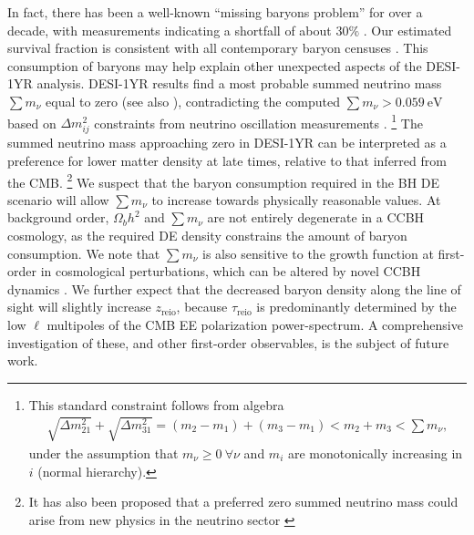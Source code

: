\documentclass[a4paper,11pt]{article}
\begin{document}
In fact, there has been a well-known ``missing baryons problem'' for over a decade, with measurements indicating a shortfall of about $30\%$ \cite{Shull2012}.
Our estimated survival fraction is consistent with all contemporary baryon censuses \cite[][Fig.~1]{Driver2021}. 
This consumption of baryons may help explain other unexpected aspects of the DESI-1YR analysis.
DESI-1YR results find a most probable summed neutrino mass $\sum m_\nu$ equal to zero \cite[Fig.~11, Left Panel][]{desicollaboration2024desi}(see also \cite{Wang:2024hen}), contradicting the computed $\sum m_\nu > 0.059~\mathrm{eV}$ based on $\Delta m_{ij}^2 $ constraints from neutrino oscillation measurements \cite[e.g.][]{dayabay, 2021Univ....7..459G}.%
\footnote{This standard constraint follows from algebra
\begin{align}
  \sqrt{\Delta m_{21}^2} + \sqrt{\Delta m_{31}^2} = (m_2 - m_1) + (m_3 - m_1) < m_2 + m_3 < \sum m_\nu,
\end{align}
under the assumption that $m_\nu \geqslant 0~\forall \nu$ and $m_i$ are monotonically increasing in $i$ (normal hierarchy).}
The summed neutrino mass approaching zero in DESI-1YR can be interpreted as a preference for lower matter density at late times, relative to that inferred from the CMB.%
\footnote{It has also been proposed that a preferred zero summed neutrino mass could arise from new physics in the neutrino sector \cite{Craig:2024tky}}
We suspect that the baryon consumption required in the BH DE scenario will allow $\sum m_\nu$ to increase towards physically reasonable values.
At background order, $\Omega_bh^2$ and $\sum m_\nu$ are not entirely degenerate in a CCBH cosmology, as the required DE density constrains the amount of baryon consumption.
We note that $\sum m_\nu$ is also sensitive to the growth function at first-order in cosmological perturbations, which can be altered by novel CCBH dynamics \cite[e.g.][\S4]{CrokerRunburg20}. 
We further expect that the decreased baryon density along the line of sight will slightly increase $z_\mathrm{reio}$, because $\tau_\mathrm{reio}$ is predominantly determined by the low $\ell$ multipoles of the CMB EE polarization power-spectrum.
A comprehensive investigation of these, and other first-order observables, is the subject of future work.
\end{document}
